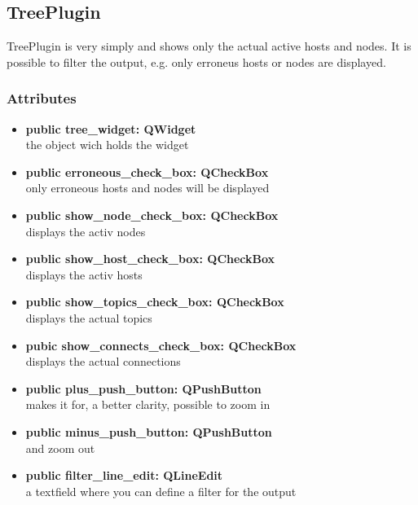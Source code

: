 \subsection{TreePlugin}
TreePlugin is very simply and shows only the actual active hosts
and nodes. It is possible to filter the output, e.g. only erroneus hosts or
nodes are displayed.
\subsubsection{Attributes}
\begin{itemize}
  \item \textbf{public tree\_widget: QWidget}\\
  the object wich holds the widget
  \item \textbf{public erroneous\_check\_box: QCheckBox}\\
  only erroneous hosts and nodes will be displayed
  \item \textbf{public show\_node\_check\_box: QCheckBox}\\
  displays the activ nodes
  \item \textbf{public show\_host\_check\_box: QCheckBox}\\
  displays the activ hosts
  \item \textbf{public show\_topics\_check\_box: QCheckBox}\\
  displays the actual topics
  \item \textbf{pubic show\_connects\_check\_box: QCheckBox}\\
  displays the actual connections
  \item \textbf{public plus\_push\_button: QPushButton}\\
  makes it for, a better clarity, possible to zoom in  
  \item \textbf{public minus\_push\_button: QPushButton}\\
  and zoom out
  \item \textbf{public filter\_line\_edit: QLineEdit}\\
  a textfield where you can define a filter for the output
\end{itemize}
